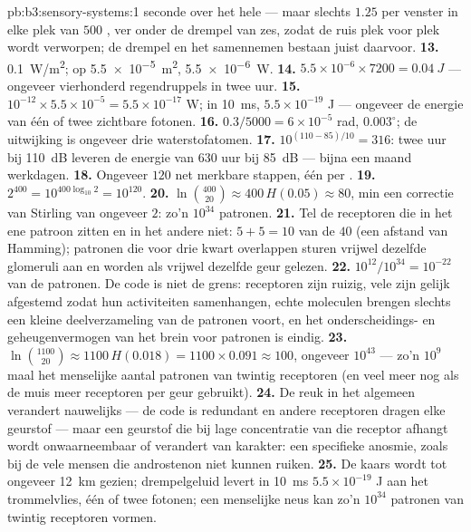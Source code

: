 \begin{solution}{pb:b3:sensory-systems:1}
seconde over het hele  --- maar slechts $1.25$ per venster in
elke plek van $500$ , ver onder de drempel van zes, zodat de
ruis plek voor plek wordt verworpen; de drempel en het samennemen
bestaan juist daarvoor.
\textbf{13.} \qty{0.1}{W/m^2}; op \qty{5.5e-5}{m^2}, \qty{5.5e-6}{W}.
\textbf{14.} $5.5\times 10^{-6}\times 7200 = \qty{0.04}{J}$ --- ongeveer
vierhonderd regendruppels in twee uur.
\textbf{15.} $10^{-12}\times 5.5\times 10^{-5} = 5.5\times 10^{-17}$ W;
in \qty{10}{ms}, $5.5\times 10^{-19}$ J --- ongeveer de energie van één
of twee zichtbare fotonen.
\textbf{16.} $0.3/5000 = 6\times 10^{-5}$ rad, $0.003^{\circ}$; de
uitwijking is ongeveer drie waterstofatomen.
\textbf{17.} $10^{(110 - 85)/10} = 316$: twee uur bij \qty{110}{dB}
leveren de energie van $630$ uur bij \qty{85}{dB} --- bijna een maand
werkdagen.
\textbf{18.} Ongeveer $120$ net merkbare stappen, één per .
\textbf{19.} $2^{400} = 10^{400\log_{10}2} = 10^{120}$.
\textbf{20.} $\ln\binom{400}{20} \approx 400\,H(0.05) \approx 80$, min
een correctie van Stirling van ongeveer $2$: zo'n $10^{34}$ patronen.
\textbf{21.} Tel de receptoren die in het ene patroon zitten en in het
andere niet: $5 +
5 = 10$ van de $40$ (een afstand van Hamming); patronen die voor drie
kwart overlappen sturen vrijwel dezelfde glomeruli aan en worden als
vrijwel dezelfde geur gelezen.
\textbf{22.} $10^{12}/10^{34} = 10^{-22}$ van de patronen. De code is
niet de grens: receptoren zijn ruizig, vele zijn gelijk afgestemd zodat
hun activiteiten samenhangen, echte moleculen brengen slechts een
kleine deelverzameling van de patronen voort, en het onderscheidings-
en geheugenvermogen van het brein voor patronen is eindig.
\textbf{23.} $\ln\binom{1100}{20} \approx 1100\,H(0.018) = 1100\times
0.091 \approx 100$, ongeveer $10^{43}$ --- zo'n $10^{9}$ maal het
menselijke aantal patronen van twintig receptoren (en veel meer nog als
de muis meer receptoren per geur gebruikt).
\textbf{24.} De reuk in het algemeen verandert nauwelijks --- de code is
redundant en andere receptoren dragen elke geurstof --- maar een
geurstof die bij lage concentratie van die receptor afhangt wordt
onwaarneembaar of verandert van karakter: een specifieke anosmie, zoals
bij de vele mensen die androstenon niet kunnen ruiken.
\textbf{25.} De kaars wordt tot ongeveer \qty{12}{km} gezien;
drempelgeluid levert in \qty{10}{ms} $5.5\times 10^{-19}$ J aan het
trommelvlies, één of twee fotonen; een menselijke neus kan zo'n
$10^{34}$ patronen van twintig receptoren vormen.
\end{solution}
